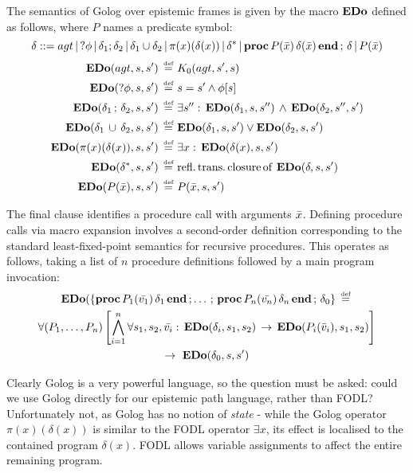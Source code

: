\begin{defnL}
 The semantics of Golog
over epistemic frames is given by the macro $\mathbf{EDo}$ defined as follows,
where $P$ names a predicate symbol:\[
\delta::=agt\,|\,?\phi\,|\,\delta_{1};\delta_{2}\,|\,\delta_{1}\cup\delta_{2}\,|\,\pi(x)(\delta(x))\,|\,\delta^{*}\,|\,\mathbf{proc}\, P(\bar{x})\,\delta(\bar{x})\,\mathbf{end}\,;\,\delta\,|\, P(\bar{x})\]
 \begin{align*}
\mathbf{EDo}(agt,s,s')\,\stackrel{\mbox{\tiny def}}{=}\,\, & K_{0}(agt,s',s)\\
\mathbf{EDo}(?\phi,s,s')\,\stackrel{\mbox{\tiny def}}{=}\,\, & s=s'\wedge\phi[s]\\
\mathbf{EDo}(\delta_{1}\,;\,\delta_{2},s,s')\,\stackrel{\mbox{\tiny def}}{=}\,\, & \exists s'':\,\mathbf{EDo}(\delta_{1},s,s'')\,\wedge\,\mathbf{EDo}(\delta_{2},s'',s')\\
\mathbf{EDo}(\delta_{1}\,\cup\,\delta_{2},s,s')\,\stackrel{\mbox{\tiny def}}{=}\,\, & \mathbf{EDo}(\delta_{1},s,s')\vee\mathbf{EDo}(\delta_{2},s,s')\\
\mathbf{EDo}(\pi(x)(\delta(x)),s,s')\,\stackrel{\mbox{\tiny def}}{=}\,\, & \exists x:\,\mathbf{EDo}(\delta(x),s,s')\\
\mathbf{EDo}(\delta^{*},s,s')\,\stackrel{\mbox{\tiny def}}{=}\,\, & \mathrm{refl.\, trans.\, closure\, of}\,\,\mathbf{EDo}(\delta,s,s')\\
\mathbf{EDo}(P(\bar{x}),s,s')\,\stackrel{\mbox{\tiny def}}{=}\,\, & P(\bar{x},s,s')\end{align*}

\end{defnL}
The final clause identifies a procedure call with arguments $\bar{x}$.
Defining procedure calls via macro expansion involves a second-order
definition corresponding to the standard least-fixed-point semantics
for recursive procedures. This operates as follows, taking a list
of $n$ procedure definitions followed by a main program invocation:\begin{multline*}
\mathbf{EDo}(\{\mathbf{proc}\, P_{1}(\bar{v_{1}})\,\delta_{1}\,\mathbf{end}\,;\dots\,;\,\mathbf{proc}\, P_{n}(\bar{v_{n}})\,\delta_{n}\,\mathbf{end}\,;\,\delta_{0}\}\,\stackrel{\mbox{\tiny def}}{=}\,\\
\forall(P_{1},\dots,P_{n})\left[\bigwedge_{i=1}^{n}\forall s_{1},s_{2},\bar{v_{i}}:\,\mathbf{EDo}(\delta_{i},s_{1},s_{2})\,\rightarrow\,\mathbf{EDo}(P_{i}(\bar{v}_{i}),s_{1},s_{2})\right]\\
\rightarrow\,\,\mathbf{EDo}(\delta_{0},s,s')\end{multline*}


Clearly Golog is a very powerful language, so the question must be
asked: could we use Golog directly for our epistemic path language,
rather than FODL? Unfortunately not, as Golog has no notion of \emph{state}
- while the Golog operator $\pi(x)(\delta(x))$ is similar to the
FODL operator $\exists x$, its effect is localised to the contained
program $\delta(x)$. FODL allows variable assignments to affect the
entire remaining program.

